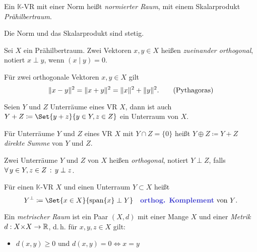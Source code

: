 \documentclass{cheat-sheet}
\newcommand{\K}{\mathbb{K}}
\newcommand{\scp}[2]{\left( #1 \!\mid\! #2 \right)} %
\begin{document}
\begin{definition}
  Ein $\K$-VR mit einer Norm heißt \emph{normierter Raum}, mit einem Skalarprodukt \emph{Prähilbertraum}.
\end{definition}

\begin{satz}
  Die Norm und das Skalarprodukt sind stetig.
\end{satz}

\begin{definition}
  Sei $X$ ein Prähilbertraum. Zwei Vektoren $x, y \in X$ heißen \emph{zueinander orthogonal}, notiert $x \perp y$, wenn $\scp{x}{y} = 0$.
\end{definition}

\begin{satz}
  Für zwei orthogonale Vektoren $x, y \in X$ gilt
  \[ \lVert x - y\rVert^2 = \lVert x + y\rVert^2 = \lVert x\rVert^2 + \lVert y\rVert^2. \tag*{(Pythagoras)} \]
\end{satz}

\begin{lem}
  Seien $Y$ und $Z$ Unterräume eines VR $X$, dann ist auch $Y + Z \coloneqq \Set{ y + z }{ y \in Y, z \in Z }$ ein Unterraum von $X$.
\end{lem}

\begin{definition}
  Für Unterräume $Y$ und $Z$ eines VR $X$ mit $Y \cap Z = \{ 0 \}$ heißt $Y \oplus Z \coloneqq Y + Z$ \emph{direkte Summe} von $Y$ und $Z$.
\end{definition}

\begin{definition}
  Zwei Unterräume $Y$ und $Z$ von $X$ heißen \emph{orthogonal}, notiert $Y \perp Z$, falls $\forall \, {y \in Y, z \in Z} \,:\, y \perp z$.
\end{definition}

\begin{definition}
  Für einen $\K$-VR $X$ und einen Unterraum $Y \subset X$ heißt
  \[ Y^\perp \coloneqq \Set{ x \in X }{ \mathrm{span} \{ x \} \perp Y } \quad \text{\emph{orthog. Komplement} von $Y$}. \]
\end{definition}


\begin{definition}
  Ein \emph{metrischer Raum} ist ein Paar $(X, d)$ mit einer Mange $X$ und einer \emph{Metrik} $d : X {\times} X \to \mathbb{R}$, d.\,h. für $x, y, z \in X$ gilt:
  \begin{itemize}
    \item $d(x, y) \geq 0$ \enspace und \enspace $d(x, y) = 0 \iff x = y$ 
  \end{itemize}
\end{definition}
\end{document}
